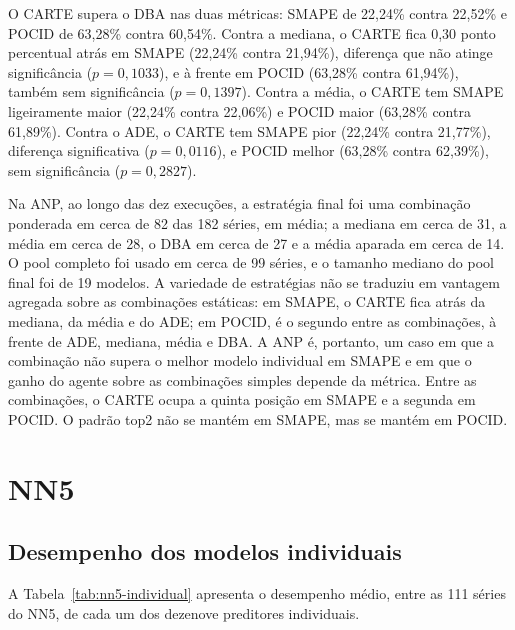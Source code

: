O CARTE supera o DBA nas duas métricas: SMAPE de 22,24\% contra 22,52\% e POCID de 63,28\% contra 60,54\%. Contra a mediana, o CARTE fica 0,30 ponto percentual atrás em SMAPE (22,24\% contra 21,94\%), diferença que não atinge significância ($p = 0{,}1033$), e à frente em POCID (63,28\% contra 61,94\%), também sem significância ($p = 0{,}1397$). Contra a média, o CARTE tem SMAPE ligeiramente maior (22,24\% contra 22,06\%) e POCID maior (63,28\% contra 61,89\%). Contra o ADE, o CARTE tem SMAPE pior (22,24\% contra 21,77\%), diferença significativa ($p = 0{,}0116$), e POCID melhor (63,28\% contra 62,39\%), sem significância ($p = 0{,}2827$).

Na ANP, ao longo das dez execuções, a estratégia final foi uma combinação ponderada em cerca de 82 das 182 séries, em média; a mediana em cerca de 31, a média em cerca de 28, o DBA em cerca de 27 e a média aparada em cerca de 14. O pool completo foi usado em cerca de 99 séries, e o tamanho mediano do pool final foi de 19 modelos. A variedade de estratégias não se traduziu em vantagem agregada sobre as combinações estáticas: em SMAPE, o CARTE fica atrás da mediana, da média e do ADE; em POCID, é o segundo entre as combinações, à frente de ADE, mediana, média e DBA. A ANP é, portanto, um caso em que a combinação não supera o melhor modelo individual em SMAPE e em que o ganho do agente sobre as combinações simples depende da métrica. Entre as combinações, o CARTE ocupa a quinta posição em SMAPE e a segunda em POCID. O padrão top2 não se mantém em SMAPE, mas se mantém em POCID.
\section{NN5} \label{sec:resultados-nn5}

\subsection{Desempenho dos modelos individuais}

A Tabela~\ref{tab:nn5-individual} apresenta o desempenho médio, entre as 111 séries do NN5, de cada um dos dezenove preditores individuais.

